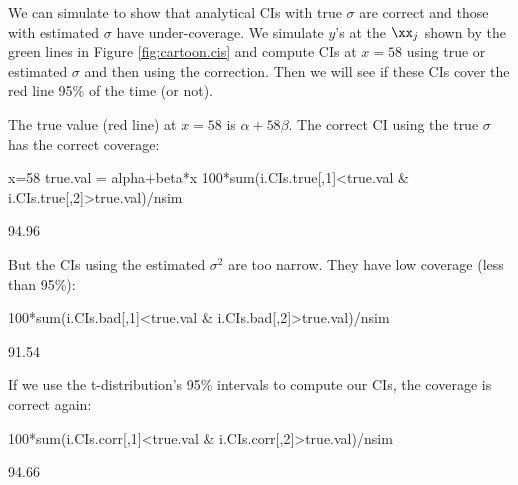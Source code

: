 We can simulate to show that analytical CIs with true $\sigma$ are correct and those with estimated $\sigma$ have under-coverage.  We simulate $y$'s at the $\xx_j$ shown by the green lines in Figure \ref{fig:cartoon.cis} and compute CIs at $x=58$ using true or estimated $\sigma$ and then using the correction.
Then we will see if these CIs cover the red line 95\% of the time (or not).

\begin{Schunk}
\end{Schunk}

The true value (red line) at $x=58$ is $\alpha+ 58 \beta$.  The correct CI using the true $\sigma$ has the correct coverage:
\begin{Schunk}
\begin{Sinput}
 x=58
 true.val = alpha+beta*x
 100*sum(i.CIs.true[,1]<true.val & i.CIs.true[,2]>true.val)/nsim
\end{Sinput}
\begin{Soutput}
[1] 94.96
\end{Soutput}
\end{Schunk}
But the CIs using the estimated $\sigma^2$ are too narrow.  They have low coverage (less than 95\%):
\begin{Schunk}
\begin{Sinput}
 100*sum(i.CIs.bad[,1]<true.val & i.CIs.bad[,2]>true.val)/nsim
\end{Sinput}
\begin{Soutput}
[1] 91.54
\end{Soutput}
\end{Schunk}
If we use the t-distribution's 95\% intervals to compute our CIs, the coverage is correct again:
\begin{Schunk}
\begin{Sinput}
 100*sum(i.CIs.corr[,1]<true.val & i.CIs.corr[,2]>true.val)/nsim
\end{Sinput}
\begin{Soutput}
[1] 94.66
\end{Soutput}
\end{Schunk}

